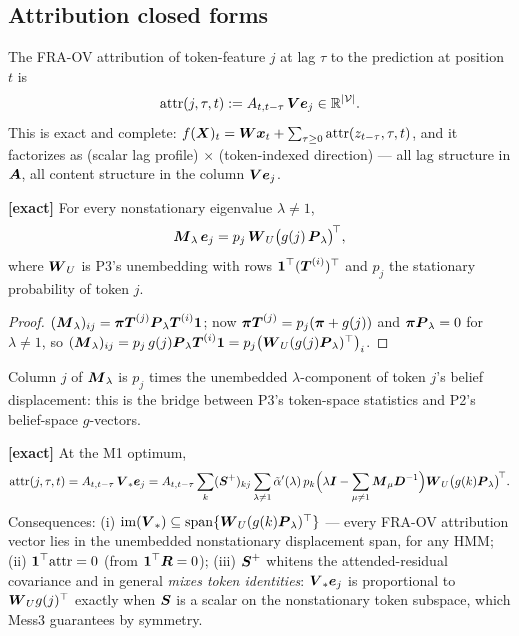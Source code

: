 \documentclass{article}
\begin{document}
\subsection{Attribution closed forms}

\begin{definition}\label{def:ovattr}
The FRA-OV attribution of token-feature $j$ at lag $\tau$ to the prediction at position $t$ is
\begin{equation}
    \mathrm{attr}(j, \tau, t) := A_{t, t-\tau}\,\boldsymbol{V}\boldsymbol{e}_j \in \mathbb{R}^{{\vert \mathcal{V}\vert}} .
\end{equation}
This is exact and complete: $f(\boldsymbol{X})_t = \boldsymbol{W}\boldsymbol{x}_t + \sum_{\tau\ge0}\mathrm{attr}(z_{t-\tau}, \tau, t)$, and it factorizes as (scalar lag profile) $\times$ (token-indexed direction) --- all lag structure in $\boldsymbol{A}$, all content structure in the column $\boldsymbol{V}\boldsymbol{e}_j$.
\end{definition}

\begin{lemma}\label{lem:column}
\textbf{[exact]} For every nonstationary eigenvalue $\lambda \ne 1$,
\begin{equation}
    \boldsymbol{M}_\lambda\,\boldsymbol{e}_j = p_j\,\boldsymbol{W}_U\big(g(j)\,\boldsymbol{P}_\lambda\big)^{\!\top} ,
\end{equation}
where $\boldsymbol{W}_U$ is P3's unembedding with rows $\boldsymbol{1}^\top(\boldsymbol{T}^{(i)})^\top$ and $p_j$ the stationary probability of token $j$.
\end{lemma}
\begin{proof}
$(\boldsymbol{M}_\lambda)_{ij} = \boldsymbol{\pi}\boldsymbol{T}^{(j)}\boldsymbol{P}_\lambda\boldsymbol{T}^{(i)}\boldsymbol{1}$; now $\boldsymbol{\pi}\boldsymbol{T}^{(j)} = p_j(\boldsymbol{\pi} + g(j))$ and $\boldsymbol{\pi}\boldsymbol{P}_\lambda = 0$ for $\lambda \ne 1$, so $(\boldsymbol{M}_\lambda)_{ij} = p_j\, g(j)\boldsymbol{P}_\lambda\boldsymbol{T}^{(i)}\boldsymbol{1} = p_j\big(\boldsymbol{W}_U(g(j)\boldsymbol{P}_\lambda)^\top\big)_i$.
\end{proof}

Column $j$ of $\boldsymbol{M}_\lambda$ is $p_j$ times the unembedded $\lambda$-component of token $j$'s belief displacement: this is the bridge between P3's token-space statistics and P2's belief-space $g$-vectors.

\begin{prop}\label{prop:attrgeneral}
\textbf{[exact]} At the M1 optimum,
\begin{equation}
    \mathrm{attr}(j, \tau, t) = A_{t, t-\tau}\,\boldsymbol{V}_*\boldsymbol{e}_j
    = A_{t, t-\tau}\sum_k (\boldsymbol{S}^+)_{kj}\sum_{\lambda\ne1}\Tilde{\alpha}'(\lambda)\,
    p_k\Big(\lambda\boldsymbol{I} - \sum_{\mu\ne1}\boldsymbol{M}_\mu\boldsymbol{D}^{-1}\Big)\boldsymbol{W}_U\big(g(k)\boldsymbol{P}_\lambda\big)^{\!\top} .
\end{equation}
Consequences: (i) $\mathrm{im}(\boldsymbol{V}_*) \subseteq \mathrm{span}\{\boldsymbol{W}_U(g(k)\boldsymbol{P}_\lambda)^\top\}$ --- every FRA-OV attribution vector lies in the unembedded nonstationary displacement span, for any HMM; (ii) $\boldsymbol{1}^\top\mathrm{attr} = 0$ (from $\boldsymbol{1}^\top\boldsymbol{R} = 0$); (iii) $\boldsymbol{S}^+$ whitens the attended-residual covariance and in general \emph{mixes token identities}: $\boldsymbol{V}_*\boldsymbol{e}_j$ is proportional to $\boldsymbol{W}_U g(j)^\top$ exactly when $\boldsymbol{S}$ is a scalar on the nonstationary token subspace, which Mess3 guarantees by symmetry.
\end{prop}
\end{document}
